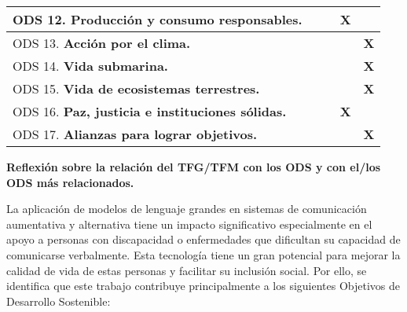 \documentclass[11pt]{article}
\begin{document}
\begin{tabular}{|l|c|c|c|c|}
ODS 12. \textbf{Producci\'on y consumo responsables.}          & & & \textbf{X} & \\ \hline
ODS 13. \textbf{Acci\'on por el clima.}                        & & & & \textbf{X} \\ \hline
ODS 14. \textbf{Vida submarina.}                               & & & & \textbf{X} \\ \hline
ODS 15. \textbf{Vida de ecosistemas terrestres.}               & & & & \textbf{X} \\ \hline
ODS 16. \textbf{Paz, justicia e instituciones s\'olidas.}      & & & \textbf{X} & \\ \hline
ODS 17. \textbf{Alianzas para lograr objetivos.}               & & &  & \textbf{X} \\ \hline
\end{tabular}

\newpage

\phantom{x}

\vspace{1ex}

\textbf{Reflexi\'on sobre la relaci\'on del TFG/TFM con los ODS y con el/los ODS m\'as relacionados.}

\vspace{1ex}

La aplicación de modelos de lenguaje grandes en sistemas de comunicación aumentativa y alternativa tiene un impacto significativo especialmente en el apoyo a personas con discapacidad o enfermedades que dificultan su capacidad de comunicarse verbalmente. Esta tecnología tiene un gran potencial para mejorar la calidad de vida de estas personas y facilitar su inclusión social. Por ello, se identifica que este trabajo contribuye principalmente a los siguientes Objetivos de Desarrollo Sostenible:
\end{document}
